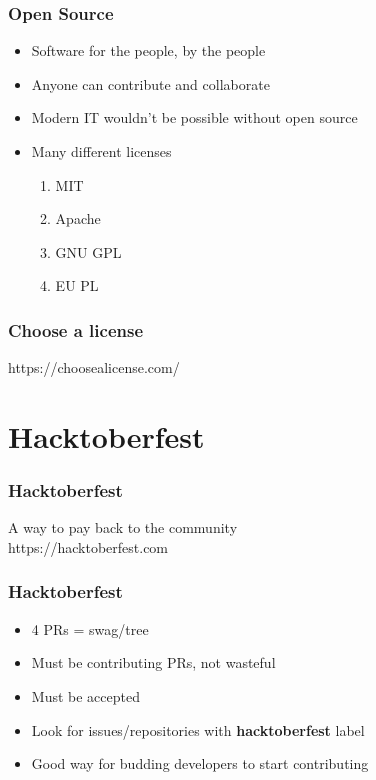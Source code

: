 \documentclass[presentation]{beamer}
\begin{document}
  \begin{frame}
    \frametitle{Open Source}
 
    \begin{itemize}
      \item Software for the people, by the people
      \item Anyone can contribute and collaborate
      \item Modern IT wouldn't be possible without open source
      \item Many different licenses
      \begin{enumerate}
        \item MIT
        \item Apache
        \item GNU GPL
        \item EU PL
      \end{enumerate}
    \end{itemize}
  \end{frame}

  \begin{frame}[standout]
    \frametitle{Choose a license}
    https://choosealicense.com/
  \end{frame}

  \section{Hacktoberfest}
  \begin{frame}[standout]
    \frametitle{Hacktoberfest}
  
    A way to pay back to the community \\

    https://hacktoberfest.com
  \end{frame}
  \begin{frame}
    \frametitle{Hacktoberfest}
  
    \begin{itemize}
      \item 4 PRs = swag/tree
      \item Must be contributing PRs, not wasteful
      \item Must be accepted
      \item Look for issues/repositories with \textbf{hacktoberfest} label
      \item Good way for budding developers to start contributing
    \end{itemize}
  \end{frame}
\end{document}
